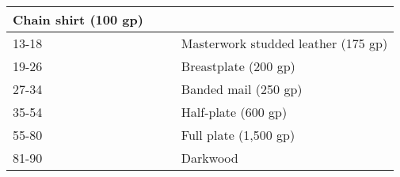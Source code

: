 \begin{longtable}{llll}
{\begin{minipage}[t]{0.896in}
Chain shirt (100 gp)\end{minipage}}\\
\hline
\multicolumn{3}{p{3.276in}|}{\begin{minipage}[t]{3.276in}\raggedright
13-18\end{minipage}} & \multicolumn{1}{|p{0.896in}|}{\begin{minipage}[t]{0.896in}\raggedright
Masterwork studded leather (175 gp)\end{minipage}}\\
\hline
\multicolumn{3}{p{3.276in}|}{\begin{minipage}[t]{3.276in}\raggedright
19-26\end{minipage}} & \multicolumn{1}{|p{0.896in}|}{\begin{minipage}[t]{0.896in}\raggedright
Breastplate (200 gp)\end{minipage}}\\
\hline
\multicolumn{3}{p{3.276in}|}{\begin{minipage}[t]{3.276in}\raggedright
27-34\end{minipage}} & \multicolumn{1}{|p{0.896in}|}{\begin{minipage}[t]{0.896in}\raggedright
Banded mail (250 gp)\end{minipage}}\\
\hline
\multicolumn{3}{p{3.276in}|}{\begin{minipage}[t]{3.276in}\raggedright
35-54\end{minipage}} & \multicolumn{1}{|p{0.896in}|}{\begin{minipage}[t]{0.896in}\raggedright
Half-plate (600 gp)\end{minipage}}\\
\hline
\multicolumn{3}{p{3.276in}|}{\begin{minipage}[t]{3.276in}\raggedright
55-80\end{minipage}} & \multicolumn{1}{|p{0.896in}|}{\begin{minipage}[t]{0.896in}\raggedright
Full plate (1,500 gp)\end{minipage}}\\
\hline
\multicolumn{3}{p{3.276in}|}{\begin{minipage}[t]{3.276in}\raggedright
81-90\end{minipage}} & \multicolumn{1}{|p{0.896in}|}{\begin{minipage}[t]{0.896in}\raggedright
Darkwood\end{minipage}}\\

\end{longtable}
